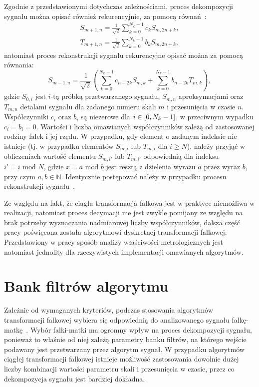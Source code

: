 Zgodnie z przedstawionymi dotychczas zależnościami, proces dekompozycji sygnału można opisać również rekurencyjnie, za pomocą równań~\cite{wallen_handbook}:
\begin{gather}
S_{m+1,n} = \frac{1}{\sqrt{2}} \sum _{k=0} ^{N_k-1} c_{k} S_{m,2n+k} \label{eq:dwt_aproxrek}, \\
T_{m+1,n} = \frac{1}{\sqrt{2}} \sum _{k=0} ^{N_k-1} b_{k} S_{m,2n+k} \label{eq:dwt_detailrek},
\end{gather}
natomiast proces rekonstrukcji sygnału rekurencyjne opisać można za pomocą równania:
\begin{equation}
S_{m-1,n} = \frac{1}{\sqrt{2}} \left( \sum _{k=0} ^{N_k-1} c_{n-2k} S_{m,k} + \sum _{k=0} ^{N_k-1} b_{n-2k} T_{m,k} \right) \label{eq:dwt_reconrek},
\end{equation}
gdzie $S_{0,i}$ jest $i$-tą próbką przetwarzanego sygnału, $S_{m,n}$ aproksymacjami oraz $T_{m,n}$ detalami sygnału dla zadanego numeru skali $m$ i przesunięcia w czasie $n$. Współczynniki $c_{i}$ oraz $b_{i}$ są niezerowe dla $i \in \interval{0}{N_k-1}$, w przeciwnym wypadku $c_{i} = b_{i} = 0$. Wartości i liczba omawianych współczynników zależą od zastosowanej rodziny falek i jej rzędu. W przypadku, gdy element o zadanym indeksie nie istnieje (tj. w przypadku elementów $S_{m,i}$ lub $T_{m,i}$ dla $i \ge N$), należy przyjąć w obliczeniach wartość elementu $S_{m,i'}$ lub $T_{m,i'}$ odpowiednią dla indeksu $i' = i \text{ mod } N$, gdzie $x = a \text{ mod } b$ jest resztą z dzielenia wyrazu $a$ przez wyraz $b$, przy czym $a, b \in \mathbb{N}$. Identycznie postępować należy w przypadku procesu rekonstrukcji sygnału~\cite{wallen_handbook, mallat_wavelet}.

Ze względu na fakt, że ciągła transformacja falkowa jest w praktyce niemożliwa w realizacji, natomiast proces decymacji nie jest zwykle pomijany ze względu na brak potrzeby wyznaczania nadmiarowej liczby współczynników, dalsza część pracy poświęcona została algorytmowi dyskretnej transformacji falkowej. Przedstawiony w pracy sposób analizy właściwości metrologicznych jest natomiast jednolity dla rzeczywistych implementacji omawianych algorytmów.

\section{Bank filtrów algorytmu}

Zależnie od wymaganych kryteriów, podczas stosowania algorytmów transformacji falkowej wybiera się odpowiednią do analizowanego sygnału falkę-matkę~\cite{akujuobi_applications}. Wybór falki-matki ma ogromny wpływ na proces dekompozycji sygnału, ponieważ to właśnie od niej zależą parametry banku filtrów, na którego wejście podawany jest przetwarzany przez algorytm sygnał. W przypadku algorytmów ciągłej transformacji falkowej istnieje możliwość zastosowania dowolnie dużej liczby kombinacji wartości parametru skali i przesunięcia w czasie, przez co dekompozycja sygnału jest bardziej dokładna.

